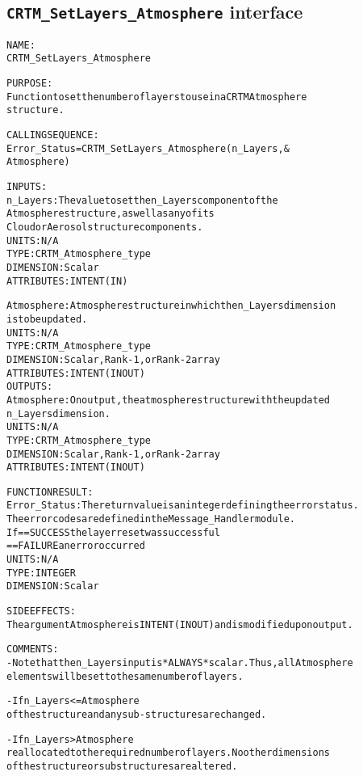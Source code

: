 \subsection{\texttt{CRTM\_SetLayers\_Atmosphere} interface}
  \label{sec:CRTM_SetLayers_Atmosphere_interface}
  \begin{alltt}
 
  NAME:
        CRTM_SetLayers_Atmosphere
  
  PURPOSE:
        Function to set the number of layers to use in a CRTM Atmosphere
        structure.
 
  CALLING SEQUENCE:
        Error_Status = CRTM_SetLayers_Atmosphere( n_Layers  , &
                                                  Atmosphere  )
 
  INPUTS:
        n_Layers:     The value to set the n_Layers component of the 
                      Atmosphere structure, as well as any of its
                      Cloud or Aerosol structure components.
                      UNITS:      N/A
                      TYPE:       CRTM_Atmosphere_type
                      DIMENSION:  Scalar
                      ATTRIBUTES: INTENT(IN)
 
        Atmosphere:   Atmosphere structure in which the n_Layers dimension
                      is to be updated.
                      UNITS:      N/A
                      TYPE:       CRTM_Atmosphere_type
                      DIMENSION:  Scalar, Rank-1, or Rank-2 array
                      ATTRIBUTES: INTENT(IN OUT)
  OUTPUTS:
        Atmosphere:   On output, the atmosphere structure with the updated
                      n_Layers dimension.
                      UNITS:      N/A
                      TYPE:       CRTM_Atmosphere_type
                      DIMENSION:  Scalar, Rank-1, or Rank-2 array
                      ATTRIBUTES: INTENT(IN OUT)
 
  FUNCTION RESULT:
        Error_Status: The return value is an integer defining the error status.
                      The error codes are defined in the Message_Handler module.
                      If == SUCCESS the layer reset was successful
                         == FAILURE an error occurred
                      UNITS:      N/A
                      TYPE:       INTEGER
                      DIMENSION:  Scalar
 
  SIDE EFFECTS:
        The argument Atmosphere is INTENT(IN OUT) and is modified upon output.
 
  COMMENTS:
        - Note that the n_Layers input is *ALWAYS* scalar. Thus, all Atmosphere
          elements will be set to the same number of layers.
 
        - If n_Layers <= Atmosphere%Max_Layers, then only the dimension value
          of the structure and any sub-structures are changed.
 
        - If n_Layers > Atmosphere%Max_Layers, then the entire structure is
          reallocated to the required number of layers. No other dimensions
          of the structure or substructures are altered.
 
  \end{alltt}
